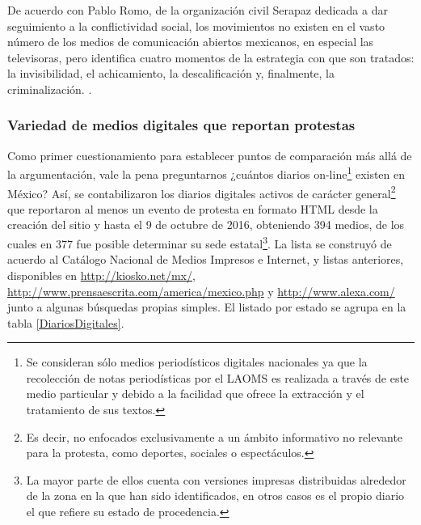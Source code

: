 \documentclass[letterpaper, 11pt]{book}
\theoremstyle{definition}
\theoremstyle{remark}
\begin{document}
\begin{center}
    \begin{minipage}{0.9\linewidth}
        {\setlength{\parindent}{12pt}\small
         De acuerdo con Pablo Romo, de la organización civil Serapaz dedicada a dar seguimiento a la conflictividad social, los movimientos no existen en el vasto número de los medios de comunicación abiertos mexicanos, en especial las televisoras, pero identifica cuatro momentos de la estrategia con que son tratados: la invisibilidad, el achicamiento, la descalificación y, finalmente, la criminalización. \normalsize \citep[47]{2013_Rovira_ActivismoMediatico}.
        }
    \end{minipage}
\end{center}



\subsubsection{Variedad de medios digitales que reportan protestas}
\label{sec:Mediosnacionales_VariedadMedios}

Como primer cuestionamiento para establecer puntos de comparación más allá de la argumentación, vale la pena preguntarnos ¿cuántos diarios on-line\footnote{Se consideran sólo medios periodísticos digitales nacionales ya que la recolección de notas periodísticas por el LAOMS es realizada a través de este medio particular y debido a la facilidad que ofrece la extracción y el tratamiento de sus textos.} existen en México? 
Así, se contabilizaron los diarios digitales activos de carácter general\footnote{Es decir, no enfocados exclusivamente a un ámbito informativo no relevante para la protesta, como deportes, sociales o espectáculos.} que reportaron al menos un evento de protesta en formato HTML desde la creación del sitio y hasta el 9 de octubre de 2016, obteniendo 394 medios, de los cuales en 377 fue posible determinar su sede estatal\footnote{La mayor parte de ellos cuenta con versiones impresas distribuidas alrededor de la zona en la que han sido identificados, en otros casos es el propio diario el que refiere su estado de procedencia.}. 
La lista se construyó de acuerdo al Catálogo Nacional de Medios Impresos e Internet, \citet{2016_INE_catalogoMedios} y listas anteriores, disponibles en \url{http://kiosko.net/mx/}, \url{http://www.prensaescrita.com/america/mexico.php} y \url{http://www.alexa.com/} junto a algunas búsquedas propias simples. El listado por estado se agrupa en la tabla \ref{DiariosDigitales}.
\end{document}
